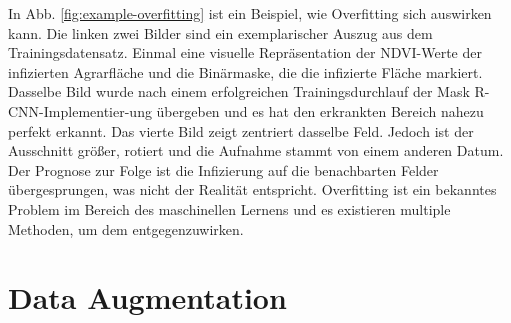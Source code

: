 \noindent
In Abb. \ref{fig:example-overfitting} ist ein Beispiel, wie Overfitting sich auswirken kann. Die linken zwei Bilder sind ein exemplarischer Auszug aus dem Trainingsdatensatz. Einmal eine visuelle Repräsentation der NDVI-Werte der infizierten Agrarfläche und die Binärmaske, die die infizierte Fläche markiert. Dasselbe Bild wurde nach einem erfolgreichen Trainingsdurchlauf der Mask R-CNN-Implementier-ung übergeben und es hat den erkrankten Bereich nahezu perfekt erkannt. Das vierte Bild zeigt zentriert dasselbe Feld. Jedoch ist der Ausschnitt größer, rotiert und die Aufnahme stammt von einem anderen Datum. Der Prognose zur Folge ist die Infizierung auf die benachbarten Felder übergesprungen, was nicht der Realität entspricht. Overfitting ist ein bekanntes Problem im Bereich des maschinellen Lernens und es existieren multiple Methoden, um dem entgegenzuwirken.

\section{Data Augmentation}\label{sec:augmentation}

